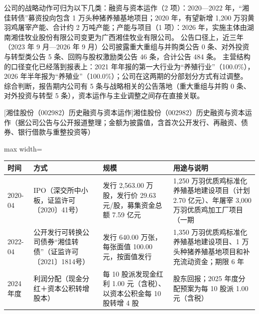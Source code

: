  公司的战略动作可归为以下几类：融资与资本运作（2 项）：2020---2022 年，“湘佳转债”募资投向包含 1 万头种猪养殖基地项目；2020 年，有望新增 1,200 万羽黄羽鸡屠宰产能、合计约 2 万吨产能；产能与项目（1 项）：2026 年，实施主体由湖南湘佳牧业股份有限公司变更为广西湘佳牧业有限公司。 公告口径上，近三年（2023 年 9 月---2026 年 9 月）公司披露重大重组与并购类公告 0 条、对外投资与转型类公告 5 条、回购与股权激励类公告 46 条，合计公告 484 条。 主营结构的口径变化已经落到报表上：2021 年年报的第一大行业为“养殖行业”（100.0\%），2026 年半年报为“养殖业”（100.0\%）；公司在这两期的分部划分方式有过调整。 综合判断，报告期内公司有 5 条与战略相关的公告落地（重大重组与并购 0 条、对外投资与转型 5 条），资本运作与主业调整之间存在直接关联。

\begin{center}\small\setlength{\tabcolsep}{4pt}
[湘佳股份（002982）历史融资与资本运作]{湘佳股份（002982）历史融资与资本运作（据公司公告与公开报道整理；金额为披露值，含首次公开发行、再融资、债券、银行借款与重整投资等）}
\begin{adjustbox}{max width=\textwidth}
\begin{tabular}{@{}p{1.45cm}p{2.55cm}p{4.05cm}p{4.95cm}@{}}
\toprule
时间 & 方式 & 规模 & 用途与说明 \\
\midrule
2020-04 & IPO（深交所中小板，证监许可〔2020〕41号） & 发行 2,\allowbreak{}563.00 万股，\allowbreak{}发行价 29.63 元/\allowbreak{}股，\allowbreak{}募集资金总额 7.59 亿元 & 1,\allowbreak{}250 万羽优质鸡标准化养殖基地建设项目（计划 2.70 亿元）、\allowbreak{}年屠宰 3,\allowbreak{}000 万羽优质鸡加工厂项目（一期 \\
2022-04 & 公开发行可转换公司债券“湘佳转债”（证监许可〔2021〕1814号） & 发行 640.00 万张，\allowbreak{}每张面值 100.00 元，\allowbreak{}按面值发行 & 1,\allowbreak{}350 万羽优质鸡标准化养殖基地建设项目、\allowbreak{}1 万头种猪养殖基地项目和补充流动资金；期限 6 年 \\
2024 年度 & 利润分配（现金分红＋资本公积转增股本） & 每 10 股派发现金红利 1.00 元（含税）、\allowbreak{}以资本公积金每 10 股转增 4 股 & 股东回报；2025 年度分配预案为每 10 股派 1.00 元（含税） \\
\bottomrule
\end{tabular}
\end{adjustbox}
\end{center}

